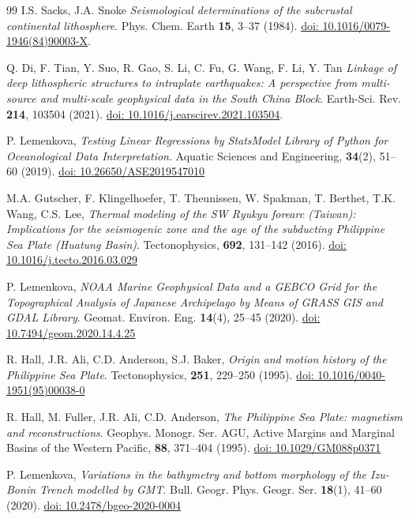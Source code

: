\documentclass{rrparticle}
\begin{document}
\begin{thebibliography}{99}
 I.S. Sacks, J.A. Snoke \emph{Seismological determinations of the subcrustal continental lithosphere}. Phys. Chem. Earth \textbf{15}, 3--37 (1984). \href{https://doi.org/10.1016/0079-1946(84)90003-X}{doi: 10.1016/0079-1946(84)90003-X}.

 Q. Di, F. Tian, Y. Suo, R. Gao, S. Li, C. Fu, G. Wang, F. Li, Y. Tan \emph{Linkage of deep lithospheric structures to intraplate earthquakes: A perspective from multi-source and multi-scale geophysical data in the South China Block}. Earth-Sci. Rev. \textbf{214}, 103504 (2021). \href{https://doi.org/10.1016/j.earscirev.2021.103504}{doi: 10.1016/j.earscirev.2021.103504}.

 P. Lemenkova, \emph{Testing Linear Regressions by StatsModel Library of Python for Oceanological Data Interpretation}. Aquatic Sciences and Engineering, \textbf{34}(2), 51--60 (2019). \href{https://doi.org/10.26650/ASE2019547010}{doi: 10.26650/ASE2019547010}
	
 M.A. Gutscher, F. Klingelhoefer, T. Theunissen, W. Spakman, T. Berthet, T.K. Wang, C.S. Lee, \emph{Thermal modeling of the SW Ryukyu forearc (Taiwan): Implications for the seismogenic zone and the age of the subducting Philippine Sea Plate (Huatung Basin)}. Tectonophysics, \textbf{692}, 131--142 (2016). \href{https://doi.org/10.1016/j.tecto.2016.03.029}{doi: 10.1016/j.tecto.2016.03.029}

 P. Lemenkova, \emph{NOAA Marine Geophysical Data and a GEBCO Grid for the Topographical Analysis of Japanese Archipelago by Means of GRASS GIS and GDAL Library}. Geomat. Environ. Eng. \textbf{14}(4), 25--45 (2020). \href{https://doi.org/10.7494/geom.2020.14.4.25}{doi: 10.7494/geom.2020.14.4.25}

 R. Hall, J.R. Ali, C.D. Anderson, S.J. Baker, \emph{Origin and motion history of the Philippine Sea Plate}. Tectonophysics, \textbf{251}, 229--250 (1995). \href{https://doi.org/10.1016/0040-1951(95)00038-0}{doi: 10.1016/0040-1951(95)00038-0}

 R. Hall, M. Fuller, J.R. Ali, C.D. Anderson, \emph{The Philippine Sea Plate: magnetism and reconstructions}. Geophys. Monogr. Ser. AGU, Active Margins and Marginal Basins of the Western Pacific, \textbf{88}, 371--404 (1995). \href{https://doi.org/10.1029/GM088p0371}{doi: 10.1029/GM088p0371}

 P. Lemenkova, \emph{Variations in the bathymetry and bottom morphology of the Izu-Bonin Trench modelled by GMT}. Bull. Geogr. Phys. Geogr. Ser. \textbf{18}(1), 41--60 (2020). \href{https://doi.org/10.2478/bgeo-2020-0004}{doi: 10.2478/bgeo-2020-0004}


\end{thebibliography}
\end{document}
